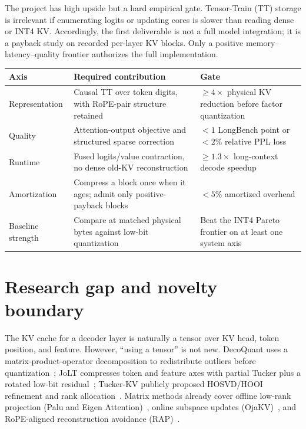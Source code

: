 \documentclass[11pt]{article}
\begin{document}
The project has high upside but a hard empirical gate. Tensor-Train (TT) storage is irrelevant if
enumerating logits or updating cores is slower than reading dense or INT4 KV. Accordingly, the
first deliverable is not a full model integration; it is a payback study on recorded per-layer KV
blocks. Only a positive memory--latency--quality frontier authorizes the full implementation.

\begin{center}
\small
\renewcommand{\arraystretch}{1.22}
\begin{tabularx}{.98\textwidth}{@{}p{2.55cm}X p{2.2cm}@{}}
\toprule
\textbf{Axis} & \textbf{Required contribution} & \textbf{Gate} \\
\midrule
Representation & Causal TT over token digits, with RoPE-pair structure retained & $\ge 4\times$ physical KV reduction before factor quantization \\
Quality & Attention-output objective and structured sparse correction & $<1$ LongBench point or $<2\%$ relative PPL loss \\
Runtime & Fused logits/value contraction, no dense old-KV reconstruction & $\ge1.3\times$ long-context decode speedup \\
Amortization & Compress a block once when it ages; admit only positive-payback blocks & $<5\%$ amortized overhead \\
Baseline strength & Compare at matched physical bytes against low-bit quantization & Beat the INT4 Pareto frontier on at least one system axis \\
\bottomrule
\end{tabularx}
\end{center}

\section{Research gap and novelty boundary}

The KV cache for a decoder layer is naturally a tensor over KV head, token position, and feature.
However, ``using a tensor'' is not new. DecoQuant uses a matrix-product-operator decomposition to
redistribute outliers before quantization~\cite{decoquant}; JoLT compresses token and feature axes
with partial Tucker plus a rotated low-bit residual~\cite{jolt}; Tucker-KV publicly proposed
HOSVD/HOOI refinement and rank allocation~\cite{tuckerkv}. Matrix methods already cover offline
low-rank projection (Palu and Eigen Attention)~\cite{palu,eigen}, online subspace updates
(OjaKV)~\cite{ojakv}, and RoPE-aligned reconstruction avoidance (RAP)~\cite{rap}.
\end{document}

